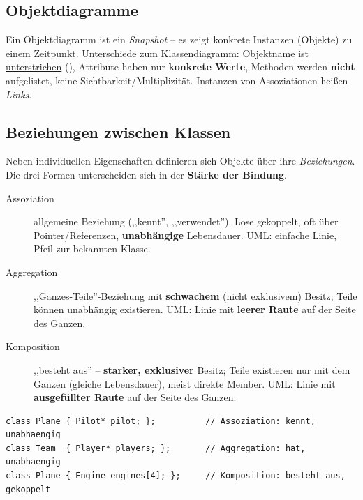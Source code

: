 \subsection{Objektdiagramme}
Ein Objektdiagramm ist ein \emph{Snapshot} -- es zeigt konkrete Instanzen (Objekte) zu einem Zeitpunkt. Unterschiede zum Klassendiagramm: Objektname ist \underline{unterstrichen} (), Attribute haben nur \textbf{konkrete Werte}, Methoden werden \textbf{nicht} aufgelistet, keine Sichtbarkeit/Multiplizit\"at. Instanzen von Assoziationen hei\ss en \emph{Links}.

\subsection{Beziehungen zwischen Klassen}
Neben individuellen Eigenschaften definieren sich Objekte \"uber ihre \emph{Beziehungen}. Die drei Formen unterscheiden sich in der \textbf{St\"arke der Bindung}.


\begin{description}
  \item[Assoziation] allgemeine Beziehung (,,kennt'', ,,verwendet''). Lose gekoppelt, oft \"uber Pointer/Referenzen, \textbf{unabh\"angige} Lebensdauer. UML: einfache Linie, Pfeil zur bekannten Klasse.
  \item[Aggregation] ,,Ganzes-Teile''-Beziehung mit \textbf{schwachem} (nicht exklusivem) Besitz; Teile k\"onnen unabh\"angig existieren. UML: Linie mit \textbf{leerer Raute} auf der Seite des Ganzen.
  \item[Komposition] ,,besteht aus'' -- \textbf{starker, exklusiver} Besitz; Teile existieren nur mit dem Ganzen (gleiche Lebensdauer), meist direkte Member. UML: Linie mit \textbf{ausgef\"ullter Raute} auf der Seite des Ganzen.
\end{description}

\begin{lstlisting}
class Plane { Pilot* pilot; };          // Assoziation: kennt, unabhaengig
class Team  { Player* players; };       // Aggregation: hat, unabhaengig
class Plane { Engine engines[4]; };     // Komposition: besteht aus, gekoppelt
\end{lstlisting}


